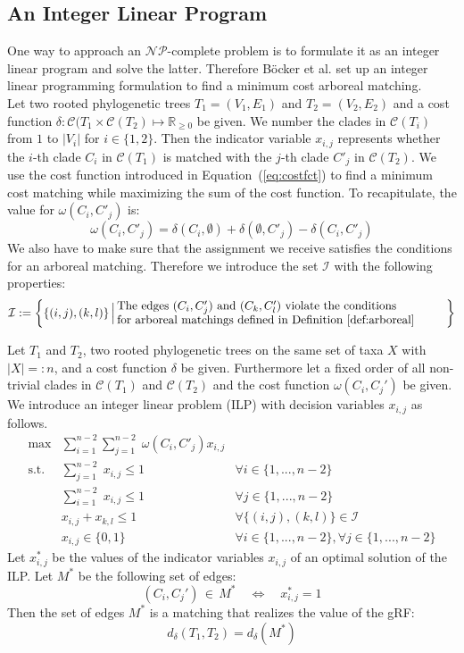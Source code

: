 \subsection{An Integer Linear Program}
One way to approach an $\mathcal{NP}$-complete problem is to formulate it as an integer linear program and solve the latter. Therefore Böcker et al. set up an integer linear programming formulation to find a minimum cost arboreal matching.\\
Let two rooted phylogenetic trees $T_1 = (V_1,E_1)$ and $T_2 = (V_2,E_2)$ and a cost function $\delta: \mathcal{C}(T_1 \times \mathcal{C}(T_2) \mapsto \mathbb{R}_{\geq 0}$ be given. We number the clades in $\mathcal{C}(T_i)$ from $1$ to $|V_i|$ for $i \in \{1,2\}$. Then the indicator variable $x_{i,j}$ represents whether the $i$-th clade $C_i$ in $\mathcal{C}(T_1)$ is matched with the $j$-th clade $C'_j$ in $\mathcal{C}(T_2)$. We use the cost function introduced in Equation~(\ref{eq:costfct}) to find a minimum cost matching while maximizing the sum of the cost function. To recapitulate, the value for $\omega(C_i,C'_j)$ is:
$$\omega(C_i,C'_j) = \delta(C_i,\emptyset) + \delta(\emptyset, C'_j) - \delta(C_i,C'_j)$$
We also have to make sure that the assignment we receive satisfies the conditions for an arboreal matching. Therefore we introduce the set $\mathcal{I}$ with the following properties:
\begin{equation}\label{eq:setI}
\mathcal{I} := \bigg\{ \{(i,j), (k,l)\} \, \Big| \, \parbox{9.8cm}{The edges $(C_i, C'_j)$ and $(C_k, C'_l)$ violate the conditions
\\for arboreal matchings defined in Definition~\ref{def:arboreal}} \bigg\}
\end{equation}
\begin{thm}\label{thm:gRF_LP}
Let $T_1$ and $T_2$, two rooted phylogenetic trees on the same set of taxa $X$ with $|X|=:n$, and a cost function $\delta$ be given. Furthermore let a fixed order of all non-trivial clades in $\mathcal{C}(T_1)$ and $\mathcal{C}(T_2)$ and the cost function $\omega(C_i,C_j')$ be given. We introduce an integer linear problem (ILP) with decision variables $x_{i,j}$ as follows.
\begin{align}
\max &\sum_{i=1}^{n-2} \sum_{j=1}^{n-2} \; \omega(C_i, C'_j) x_{i,j} \label{eq:max} \\
\text{s.t.} &\sum_{j=1}^{n-2} \; x_{i,j} \leq 1 & \forall i \in \{1,...,n-2\} \label{eq:V_1} \\
&\sum_{i=1}^{n-2} \; x_{i,j} \leq 1 & \forall j \in \{1,...,n-2\} \label{eq:V_2} \\
&x_{i,j} + x_{k,l} \leq 1 & \forall \{(i,j), (k,l)\} \in \mathcal{I} \label{eq:arb} \\
&x_{i,j} \in \{0,1\} & \forall i \in \{1,...,n-2\}, \forall j \in \{1,...,n-2\} \label{eq:int}
\end{align}
Let $x^*_{i,j}$ be the values of the indicator variables $x_{i,j}$ of an optimal solution of the ILP. Let $M^*$ be the following set of edges:
$$(C_i,C_j') \, \in \, M^* \quad \Leftrightarrow \quad x^*_{i,j} = 1$$
Then the set of edges $M^*$ is a matching that realizes the value of the gRF:
$$d_{\delta}(T_1, T_2) = d_{\delta}(M^*)$$
\end{thm}
